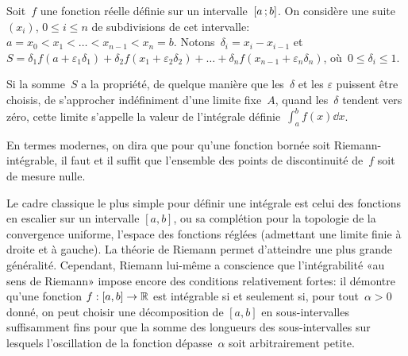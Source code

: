\begin{histoire}
\medskip
{}
\begin{definition}
Soit~$f$ une fonction réelle définie sur un intervalle~$\mathopen{[}a\,;b\mathclose{]}$.
On considère une suite~$(x_i)$, $0\le i\le n$ de subdivisions de cet intervalle:
$a=x_0 < x_1 <\ldots < x_{n-1} <x_n=b$.
Notons~$\delta_i=x_i-x_{i-1}$ et~$S=\delta_1f(a+\varepsilon_1\delta_1) +
\delta_2 f(x_1+\varepsilon_2\delta_2)+ \ldots + \delta_nf(x_{n-1}+\varepsilon_n\delta_n)$,
où~$0\le \delta_i\le 1$.

Si la somme~$S$ a la propriété, de quelque manière que les~$\delta$ et les
$\varepsilon$ puissent être choisis, de s'approcher indéfiniment d'une limite fixe~$A$,
quand les~$\delta$ tendent vers zéro, cette limite s'appelle la valeur de l'intégrale
définie~$\int_a^b f(x)\dd x$.
\end{definition}
En termes modernes, on dira que pour qu'une fonction bornée soit Riemann-intégrable,
il faut et il suffit que l'ensemble des points de discontinuité de~$f$ soit de mesure nulle.

\medskip
Le cadre classique le plus simple pour définir une intégrale est celui des fonctions en escalier sur un intervalle $[a,b]$, ou sa complétion pour la topologie de la convergence uniforme, l'espace des fonctions réglées (admettant une limite finie à droite et à gauche). La théorie de Riemann permet d'atteindre une plus grande généralité. Cependant, Riemann lui-même a conscience que l'intégrabilité «au sens de Riemann» impose encore des conditions relativement fortes: il démontre qu'une fonction $f: [a,b]\rightarrow \mathbb R$ est intégrable si et seulement si, pour tout~$\alpha>0$ donné, on peut choisir une décomposition de $[a,b]$ en sous-intervalles suffisamment fins pour que la somme des longueurs des sous-intervalles sur lesquels l'oscillation de la fonction dépasse~$\alpha$ soit arbitrairement petite.


\end{histoire}
